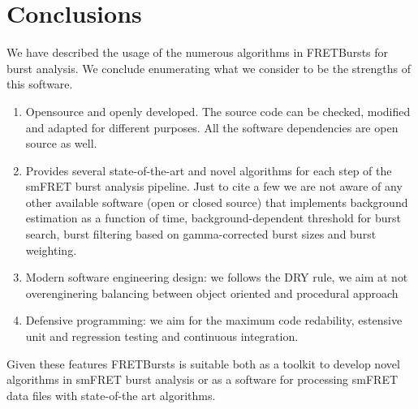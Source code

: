 \section{Conclusions}

We have described the usage of the numerous algorithms in FRETBursts
for burst analysis. We conclude enumerating what we consider to be the strengths
of this software.

\begin{enumerate}
\item Opensource and openly developed. The source code can be checked, modified and
adapted for different purposes. All the software dependencies are open source as well.
\item Provides several state-of-the-art and novel algorithms for each step of the 
smFRET burst analysis pipeline. Just to cite a few we are not aware of any other available software
(open or closed source) that implements background estimation as a function of time,
background-dependent threshold for burst search, burst filtering based on 
gamma-corrected burst sizes and burst weighting.
\item Modern software engineering design: we follows the DRY rule, we aim at not
overenginering balancing between object oriented and procedural approach
\item Defensive programming: we aim for the maximum code redability,
estensive unit and regression testing and continuous integration.
\end{enumerate}

Given these features FRETBursts is suitable both as a toolkit to develop novel algorithms
in smFRET burst analysis or as a software for processing smFRET data files with
state-of-the art algorithms.
